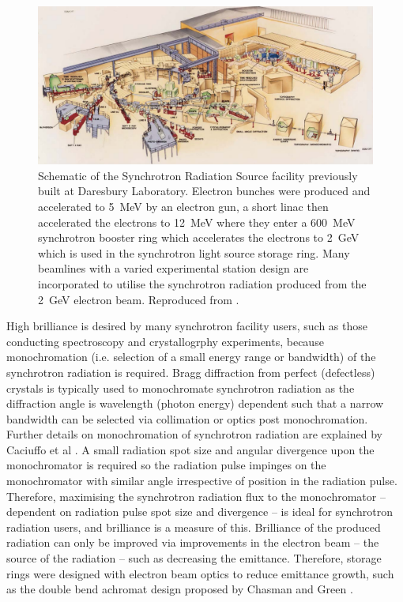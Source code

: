 \documentclass[../main.tex]{subfiles}
\begin{document}
\begin{figure}[!h]
\centering
\includegraphics[width=\textwidth]{Figures/Introduction/Daresbury_SRS.pdf}
\caption{Schematic of the Synchrotron Radiation Source facility previously built at Daresbury Laboratory. Electron bunches were produced and accelerated to 5~\si{\mega\electronvolt} by an electron gun, a short linac then accelerated the electrons to 12~\si{\mega\electronvolt} where they enter a 600~\si{\mega\electronvolt} synchrotron booster ring which accelerates the electrons to 2~\si{\giga\electronvolt} which is used in the synchrotron light source storage ring. Many beamlines with a varied experimental station design are incorporated to utilise the synchrotron radiation produced from the 2~\si{\giga\electronvolt} electron beam. Reproduced from \cite{rossmann2001international}.}
\label{fig:daresbury_SRS_diagram}
\end{figure}

High brilliance is desired by many synchrotron facility users, such as those conducting spectroscopy and crystallogrphy experiments, because monochromation (i.e. selection of a small energy range or bandwidth) of the synchrotron radiation is required. Bragg diffraction from perfect (defectless) crystals is typically used to monochromate synchrotron radiation as the diffraction angle is wavelength (photon energy) dependent such that a narrow bandwidth can be selected via collimation or optics post monochromation. Further details on monochromation of synchrotron radiation are explained by Caciuffo et al \cite{caciuffo1987monochromators}. A small radiation spot size and angular divergence upon the monochromator is required so the radiation pulse impinges on the monochromator with similar angle irrespective of position in the radiation pulse. Therefore, maximising the synchrotron radiation flux to the monochromator -- dependent on radiation pulse spot size and divergence -- is ideal for synchrotron radiation users, and brilliance is a measure of this. Brilliance of the produced radiation can only be improved via improvements in the electron beam -- the source of the radiation -- such as decreasing the emittance. Therefore, storage rings were designed with electron beam optics to reduce emittance growth, such as the double bend achromat design proposed by Chasman and Green \cite{chasman1975preliminary}.          
\end{document}
